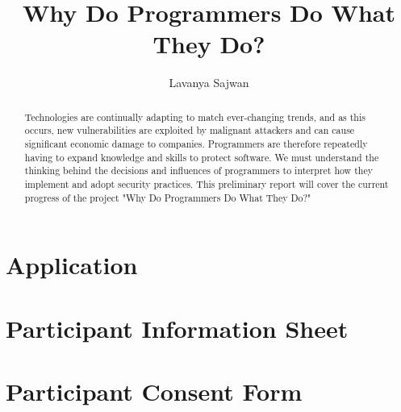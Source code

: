 \documentclass[11pt
              , a4paper
              , twoside
              , openright
              ]{report}
\title{Why Do Programmers Do What They Do?}
\author{Lavanya Sajwan}
\date{}
\begin{document}
\frontmatter



\begin{abstract}

Technologies are continually adapting to match ever-changing trends, and as this occurs, new vulnerabilities are exploited by malignant attackers and can cause significant economic damage to companies. Programmers are therefore repeatedly having to expand knowledge and skills to protect software. We must understand the thinking behind the decisions and influences of programmers to interpret how they implement and adopt security practices. This preliminary report will cover the current progress of the project "Why Do Programmers Do What They Do?"

\end{abstract}


\maketitle



\tableofcontents



\mainmatter









\appendix
\chapter{Application}

\chapter{Participant Information Sheet}

\chapter{Participant Consent Form}

\end{document}
